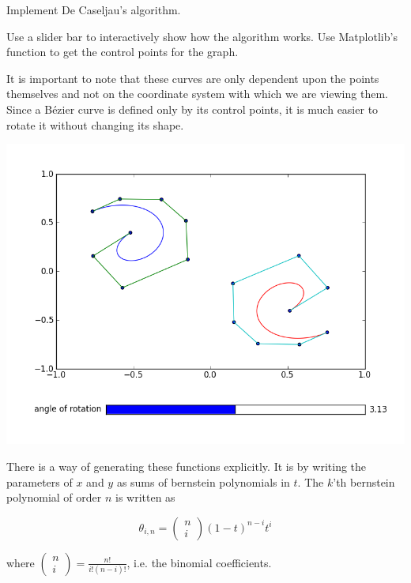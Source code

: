 \begin{problem}
Implement De Caseljau's algorithm.
\end{problem}

\begin{problem}
Use a slider bar to interactively show how the algorithm works. 
Use Matplotlib's  function to get the control points for the graph.
\end{problem}

It is important to note that these curves are only dependent upon the points themselves and not on the coordinate system with which we are viewing them. 
Since a B\'{e}zier curve is defined only by its control points, it is much easier to rotate it without changing its shape.

\includegraphics[width=\textwidth]{bezier_rotation}

There is a way of generating these functions explicitly. 
It is by writing the parameters of $x$ and $y$ as sums of bernstein polynomials in $t$. 
The $k$'th bernstein polynomial of order $n$ is written as 

$$\theta_{i,n}=\left( \begin{smallmatrix} n\\ i \end{smallmatrix} \right) (1-t)^{n-i} t^i$$

where $\left( \begin{smallmatrix} n\\ i \end{smallmatrix} \right) = \frac{n!}{i!(n-i)!}$, i.e. the binomial coefficients.


